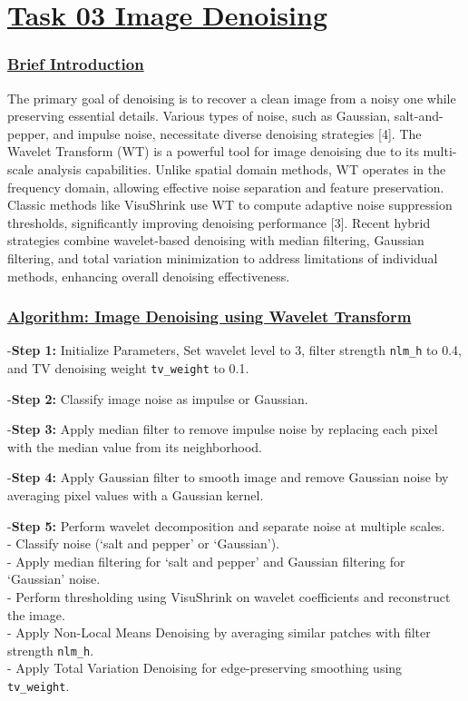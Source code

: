 \documentclass[
  11pt,
]{article}
\begin{document}
\section*{\underline{Task 03 \textendash{} Image Denoising }}

\subsubsection*{\underline{Brief Introduction}}

The primary goal of denoising is to recover a clean image from a noisy
one while preserving essential details. Various types of noise, such as
Gaussian, salt-and-pepper, and impulse noise, necessitate diverse
denoising strategies {[}4{]}. The Wavelet Transform (WT) is a powerful
tool for image denoising due to its multi-scale analysis capabilities.
Unlike spatial domain methods, WT operates in the frequency domain,
allowing effective noise separation and feature preservation. Classic
methods like VisuShrink use WT to compute adaptive noise suppression
thresholds, significantly improving denoising performance {[}3{]}.
Recent hybrid strategies combine wavelet-based denoising with median
filtering, Gaussian filtering, and total variation minimization to
address limitations of individual methods, enhancing overall denoising
effectiveness.

\subsubsection*{\underline{Algorithm: Image Denoising using Wavelet Transform}}

-\textbf{Step 1:} Initialize Parameters, Set wavelet level to 3, filter
strength \texttt{nlm\_h} to 0.4, and TV denoising weight
\texttt{tv\_weight} to 0.1.

-\textbf{Step 2:} Classify image noise as impulse or Gaussian.

-\textbf{Step 3:} Apply median filter to remove impulse noise by
replacing each pixel with the median value from its neighborhood.

-\textbf{Step 4:} Apply Gaussian filter to smooth image and remove
Gaussian noise by averaging pixel values with a Gaussian kernel.

-\textbf{Step 5:} Perform wavelet decomposition and separate noise at
multiple scales.\\
- Classify noise (`salt and pepper' or `Gaussian').\\
- Apply median filtering for `salt and pepper' and Gaussian filtering
for `Gaussian' noise.\\
- Perform thresholding using VisuShrink on wavelet coefficients and
reconstruct the image.\\
- Apply Non-Local Means Denoising by averaging similar patches with
filter strength \texttt{nlm\_h}.\\
- Apply Total Variation Denoising for edge-preserving smoothing using
\texttt{tv\_weight}.
\end{document}
